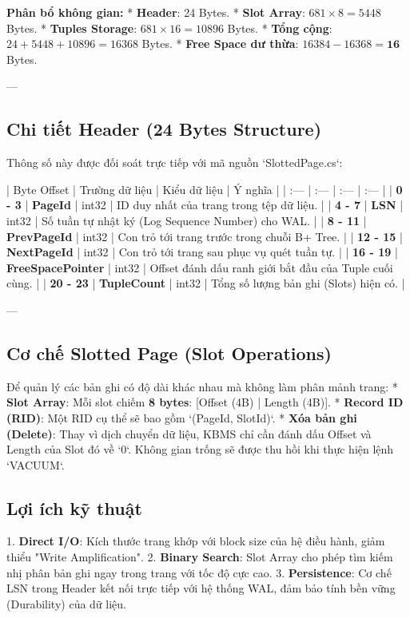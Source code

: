 \textbf{Phân bổ không gian:}
*   \textbf{Header}: 24 Bytes.
*   \textbf{Slot Array}: $681 \times 8 = 5448$ Bytes.
*   \textbf{Tuples Storage}: $681 \times 16 = 10896$ Bytes.
*   \textbf{Tổng cộng}: $24 + 5448 + 10896 = 16368$ Bytes.
*   \textbf{Free Space dư thừa}: $16384 - 16368 = \mathbf{16}$ Bytes.

---

\subsection{Chi tiết Header (24 Bytes Structure)}

Thông số này được đối soát trực tiếp với mã nguồn `SlottedPage.cs`:

| Byte Offset | Trường dữ liệu | Kiểu dữ liệu | Ý nghĩa |
| :--- | :--- | :--- | :--- |
| \textbf{0 - 3} | \textbf{PageId} | int32 | ID duy nhất của trang trong tệp dữ liệu. |
| \textbf{4 - 7} | \textbf{LSN} | int32 | Số tuần tự nhật ký (Log Sequence Number) cho WAL. |
| \textbf{8 - 11} | \textbf{PrevPageId} | int32 | Con trỏ tới trang trước trong chuỗi B+ Tree. |
| \textbf{12 - 15} | \textbf{NextPageId} | int32 | Con trỏ tới trang sau phục vụ quét tuần tự. |
| \textbf{16 - 19} | \textbf{FreeSpacePointer} | int32 | Offset đánh dấu ranh giới bắt đầu của Tuple cuối cùng. |
| \textbf{20 - 23} | \textbf{TupleCount} | int32 | Tổng số lượng bản ghi (Slots) hiện có. |

---

\subsection{Cơ chế Slotted Page (Slot Operations)}

Để quản lý các bản ghi có độ dài khác nhau mà không làm phân mảnh trang:
*   \textbf{Slot Array}: Mỗi slot chiếm \textbf{8 bytes}: [Offset (4B) | Length (4B)].
*   \textbf{Record ID (RID)}: Một RID cụ thể sẽ bao gồm `(PageId, SlotId)`.
*   \textbf{Xóa bản ghi (Delete)}: Thay vì dịch chuyển dữ liệu, KBMS chỉ cần đánh dấu Offset và Length của Slot đó về `0`. Không gian trống sẽ được thu hồi khi thực hiện lệnh `VACUUM`.

\subsection{Lợi ích kỹ thuật}

1.  \textbf{Direct I/O}: Kích thước trang khớp với block size của hệ điều hành, giảm thiểu "Write Amplification".
2.  \textbf{Binary Search}: Slot Array cho phép tìm kiếm nhị phân bản ghi ngay trong trang với tốc độ cực cao.
3.  \textbf{Persistence}: Cơ chế LSN trong Header kết nối trực tiếp với hệ thống WAL, đảm bảo tính bền vững (Durability) của dữ liệu.

